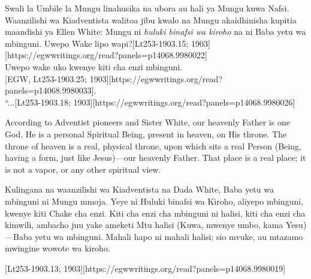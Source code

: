 Swali la Umbile la Mungu linahusika na ubora au hali ya Mungu kuwa Nafsi. Waanzilishi wa Kiadventista walitoa jibu kwalo na Mungu akaidhinisha kupitia maandishi ya Ellen White: Mungu ni \textit{huluki binafsi wa kiroho} na ni Baba yetu wa mbinguni. Uwepo Wake lipo wapi?[Lt253-1903.15; 1903][https://egwwritings.org/read?panels=p14068.9980022] \\
Uwepo wake uko kwenye kiti cha enzi mbinguni. \\
[EGW, Lt253-1903.25; 1903][https://egwwritings.org/read?panels=p14068.9980033]. \\
“...[Lt253-1903.18; 1903][https://egwwritings.org/read?panels=p14068.9980026]


According to Adventist pioneers and Sister White, our heavenly Father is one God. He is a personal Spiritual Being, present in heaven, on His throne. The throne of heaven is a real, physical throne, upon which sits a real Person (Being, having a form, just like Jesus)—our heavenly Father. That place is a real place; it is not a vapor, or any other spiritual view.


Kulingana na waanzilishi wa Kiadventista na Dada White, Baba yetu wa mbinguni ni Mungu mmoja. Yeye ni Huluki binafsi wa Kiroho, aliyepo mbinguni, kwenye kiti Chake cha enzi. Kiti cha enzi cha mbinguni ni halisi, kiti cha enzi cha kimwili, ambacho juu yake ameketi Mtu halisi (Kuwa, mwenye umbo, kama Yesu)—Baba yetu wa mbinguni. Mahali hapo ni mahali halisi; sio mvuke, au mtazamo mwingine wowote wa kiroho.


[Lt253-1903.13; 1903][https://egwwritings.org/read?panels=p14068.9980019]


